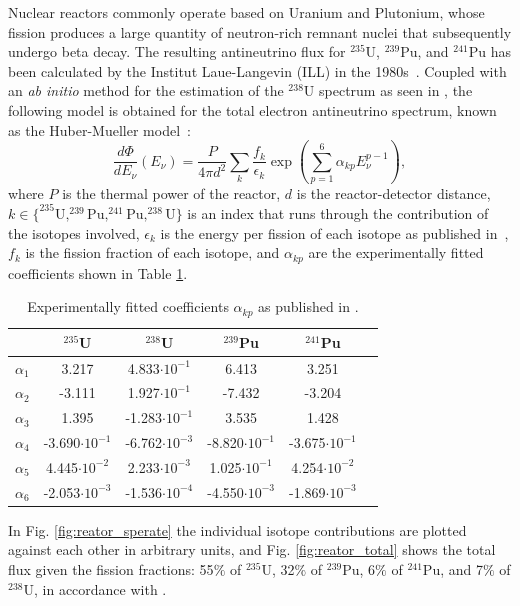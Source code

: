 Nuclear reactors commonly operate based on Uranium and Plutonium, whose fission produces a large quantity of neutron-rich remnant nuclei that subsequently undergo beta decay. The resulting antineutrino flux for $^{235}$U, $^{239}$Pu, and $^{241}$Pu has been calculated by the Institut Laue-Langevin (ILL) in the 1980s~\cite{VONFEILITZSCH1982162, SCHRECKENBACH1985325}. Coupled with an \textit{ab initio} method for the estimation of the $^{238}$U spectrum as seen in \cite{PhysRevD.70.053011}, the following model is obtained for the total electron antineutrino spectrum, known as the Huber-Mueller model~\cite{PhysRevC.83.054615}:
\begin{equation}
      \frac{d\Phi}{dE_\nu}(E_{\nu}) = \frac{P}{4 \pi d^2}\sum_{k}\frac{f_{k}}{\epsilon_{k}}\exp \left(\sum_{p=1}^{6}\alpha_{kp}E_{\nu}^{p-1}\right),
\end{equation}
where $P$ is the thermal power of the reactor, $d$ is the reactor-detector distance, $k \in \{ ^{235}\text{U}, ^{239}\text{Pu} , ^{241}\text{Pu}, ^{238}\text{U} \}$ is an index that runs through the contribution of the isotopes involved, $\epsilon_k$ is the energy per fission of each isotope as published in~\cite{Kopeikin2004}, $f_{k}$ is the fission fraction of each isotope, and $\alpha_{kp}$ are the experimentally fitted coefficients shown in Table \ref{tb:reactor_param}.
\setlength\tabcolsep{0pt}
\begin{table}
\begin{tabular*}{\linewidth}{@{\extracolsep{\fill}} cccccc }
\toprule
           & $^{235}$U             & $^{238}$U             & $^{239}$Pu            & $^{241}$Pu            \\ \midrule
$\alpha_1$ & 3.217                 & 4.833$\cdot 10^{-1}$  & 6.413                 & 3.251                 \\
$\alpha_2$ & -3.111                & 1.927$\cdot 10^{-1}$  & -7.432                & -3.204                \\
$\alpha_3$ & 1.395                 & -1.283$\cdot 10^{-1}$ & 3.535                 & 1.428                 \\
$\alpha_4$ & -3.690$\cdot 10^{-1}$ & -6.762$\cdot 10^{-3}$ & -8.820$\cdot 10^{-1}$ & -3.675$\cdot 10^{-1}$ \\
$\alpha_5$ & 4.445$\cdot 10^{-2}$  & 2.233$\cdot 10^{-3}$  & 1.025$\cdot 10^{-1}$  & 4.254$\cdot 10^{-2}$  \\
$\alpha_6$ & -2.053$\cdot 10^{-3}$ & -1.536$\cdot 10^{-4}$ & -4.550$\cdot 10^{-3}$ & -1.869$\cdot 10^{-3}$ \\ \bottomrule
\end{tabular*}

\caption{Experimentally fitted coefficients $\alpha_{kp}$ as published in \cite{PhysRevC.83.054615}.}
\label{tb:reactor_param}
\end{table}
\noindent In Fig. \ref{fig:reator_sperate} the individual isotope contributions are plotted against each other in arbitrary units, and Fig. \ref{fig:reator_total} shows the total flux given the fission fractions: 55$\%$ of $^{235}$U, 32$\%$ of $^{239}$Pu, 6$\%$ of $^{241}$Pu, and 7$\%$ of $^{238}$U, in accordance with \cite{Wong_2007}.

